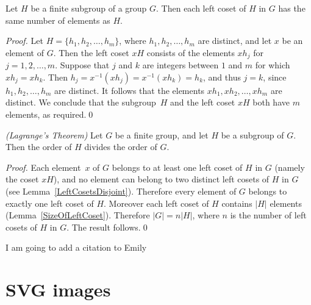 \begin{lemma}
\label{SizeOfLeftCoset}
Let $H$ be a finite subgroup of a group $G$.  Then each left
coset of $H$ in $G$ has the same number of elements as $H$.
\end{lemma}

\begin{proof}
Let $H = \{ h_1, h_2,\ldots, h_m\}$, where
$h_1, h_2,\ldots, h_m$ are distinct, and let $x$ be an
element of $G$.  Then the left coset $xH$ consists of
the elements $x h_j$ for $j = 1,2,\ldots,m$.
Suppose that $j$ and $k$ are integers between
$1$ and $m$ for which $x h_j = x h_k$.  Then
$h_j = x^{-1} (x h_j) = x^{-1} (x h_k) = h_k$,
and thus $j = k$, since $h_1, h_2,\ldots, h_m$
are distinct.  It follows that the elements
$x h_1, x h_2,\ldots, x h_m$ are distinct.
We conclude that the subgroup~$H$ and the left
coset $xH$ both have $m$ elements,
as required.\qed
\end{proof}

\begin{theorem}
\emph{(Lagrange's Theorem)}
\label{Lagrange}
Let $G$ be a finite group, and let $H$ be a subgroup
of $G$.  Then the order of $H$ divides the order of $G$.
\end{theorem}

\begin{proof}
Each element~$x$ of $G$ belongs to at least one left coset
of $H$ in $G$ (namely the coset $xH$), and no element
can belong to two distinct left cosets of $H$ in $G$
(see Lemma~\ref{LeftCosetsDisjoint}).  Therefore every
element of $G$ belongs to exactly one left coset of $H$.
Moreover each left coset of $H$ contains $|H|$ elements
(Lemma~\ref{SizeOfLeftCoset}).  Therefore $|G| = n |H|$,
where $n$ is the number of left cosets of $H$ in $G$.
The result follows.\qed
\end{proof}

I am going to add a citation to Emily \cite{20518713} \cite{20407604}

\section{SVG images}